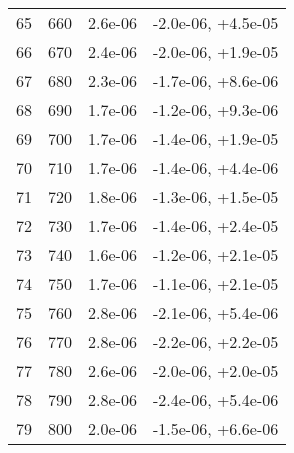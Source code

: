 \begin{table}
\begin{adjustbox}{width=1\textwidth/2}
\begin{tabular}{|c|c|c|c|}
\cline{1-4}
65 & 660 & 2.6e-06 & -2.0e-06, +4.5e-05 \\
\cline{1-4}
66 & 670 & 2.4e-06 & -2.0e-06, +1.9e-05 \\
\cline{1-4}
67 & 680 & 2.3e-06 & -1.7e-06, +8.6e-06 \\
\cline{1-4}
68 & 690 & 1.7e-06 & -1.2e-06, +9.3e-06 \\
\cline{1-4}
69 & 700 & 1.7e-06 & -1.4e-06, +1.9e-05 \\
\cline{1-4}
70 & 710 & 1.7e-06 & -1.4e-06, +4.4e-06 \\
\cline{1-4}
71 & 720 & 1.8e-06 & -1.3e-06, +1.5e-05 \\
\cline{1-4}
72 & 730 & 1.7e-06 & -1.4e-06, +2.4e-05 \\
\cline{1-4}
73 & 740 & 1.6e-06 & -1.2e-06, +2.1e-05 \\
\cline{1-4}
74 & 750 & 1.7e-06 & -1.1e-06, +2.1e-05 \\
\cline{1-4}
75 & 760 & 2.8e-06 & -2.1e-06, +5.4e-06 \\
\cline{1-4}
76 & 770 & 2.8e-06 & -2.2e-06, +2.2e-05 \\
\cline{1-4}
77 & 780 & 2.6e-06 & -2.0e-06, +2.0e-05 \\
\cline{1-4}
78 & 790 & 2.8e-06 & -2.4e-06, +5.4e-06 \\
\cline{1-4}
79 & 800 & 2.0e-06 & -1.5e-06, +6.6e-06 \\
\cline{1-4}
\end{tabular}
\end{adjustbox}
\end{table}

